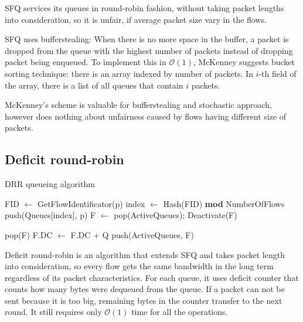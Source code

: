 SFQ services its queues in round-robin fashion, without taking packet lengths into consideration, so it is unfair, if average packet size vary in the flows.

SFQ uses bufferstealing: When there is no more space in the buffer, a packet is dropped from the queue with the highest number of packets instead of dropping packet being enqueued. To implement this in $\mathcal{O}(1)$, McKenney suggests bucket sorting technique: there is an array indexed by number of packets. In $i$-th field of the array, there is a list of all queues that contain $i$ packets.

McKenney's scheme is valuable for bufferstealing and stochastic approach, however does nothing about unfairness caused by flows having different size of packets.

\subsection{Deficit round-robin}
\label{DRR}

\begin{algorithm}[t]
	\caption{DRR queueing algorithm}
	\label{alg:DRR_deq}
	\begin{algorithmic}
		\State FID $\leftarrow$ GetFlowIdentificator(p)
		\State index $\leftarrow$ Hash(FID) \textbf{mod} NumberOfFlows
		\State push(Queues[index], p)
		\State \Return
		\EndFunction
		\State F $\leftarrow$ pop(ActiveQueues);
		\State Deactivate(F)
		
		\State \Return pop(F)
		\Else {}
		\State F.DC $\leftarrow$ F.DC + Q
		\State push(ActiveQueues, F)
		\EndIf
		\EndWhile
		\EndFunction
	\end{algorithmic}
\end{algorithm}

Deficit round-robin \cite{EffDRR} is an algorithm that extends SFQ and takes packet length into consideration, so every flow gets the same bandwidth in the long term regardless of its packet characteristics. For each queue, it uses deficit counter that counts how many bytes were dequeued from the queue. If a packet can not be sent because it is too big, remaining bytes in the counter transfer to the next round. It still requires only $\mathcal{O}(1)$ time for all the operations.

